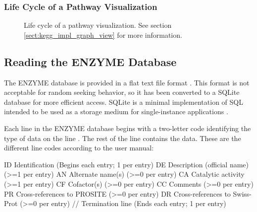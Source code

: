 \subsubsection{Life Cycle of a Pathway Visualization}

\begin{figure}[htbp]
    \caption{\label{fig:kegg_viz_life_cycle} Life cycle of a pathway
    visualization. See section \ref{sect:kegg_impl_graph_view} for more
    information.}
\end{figure}

\subsection{Reading the ENZYME Database}
\label{sect:kegg_impl_enzyme}

The ENZYME database is provided in a flat text file format
\cite{enzyme:enzuser}. This format is not acceptable for random seeking
behavior, so it has been converted to a SQLite database \cite{sqlite:main} for
more efficient access. SQLite is a minimal implementation of SQL intended to be
used as a storage medium for single-instance applications \cite{sqlite:main}.

Each line in the ENZYME database begins with a two-letter code identifying the
type of data on the line \cite{enzyme:enzuser}. The rest of the line contains
the data. These are the different line codes according to the user manual:

\begin{objc}
ID  Identification                         (Begins each entry;
                                            1 per entry)
DE  Description (official name)            (>=1 per entry)
AN  Alternate name(s)                      (>=0 per entry)
CA  Catalytic activity                     (>=1 per entry)
CF  Cofactor(s)                            (>=0 per entry)
CC  Comments                               (>=0 per entry)
PR  Cross-references to PROSITE            (>=0 per entry)
DR  Cross-references to Swiss-Prot         (>=0 per entry)
//  Termination line                       (Ends each entry;
                                            1 per entry)
\end{objc}

